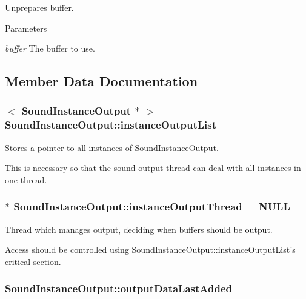 Unprepares buffer. 


\begin{DoxyParams}{Parameters}
\item[{\em buffer}]The buffer to use. \end{DoxyParams}


\subsection{Member Data Documentation}
\hypertarget{class_sound_instance_output_a6c22559d4c8c6f04ee92cf6763a8493f}{
\subsubsection[{instanceOutputList}]{$<$ {\bf SoundInstanceOutput} $\ast$ $>$ {\bf SoundInstanceOutput::instanceOutputList}}}
\label{class_sound_instance_output_a6c22559d4c8c6f04ee92cf6763a8493f}


Stores a pointer to all instances of \hyperlink{class_sound_instance_output}{SoundInstanceOutput}. 

This is necessary so that the sound output thread can deal with all instances in one thread. \hypertarget{class_sound_instance_output_af1ad50da6639146c3b0ef782bd4737ab}{
\subsubsection[{instanceOutputThread}]{ $\ast$ {\bf SoundInstanceOutput::instanceOutputThread} = NULL}}
\label{class_sound_instance_output_af1ad50da6639146c3b0ef782bd4737ab}


Thread which manages output, deciding when buffers should be output. 

Access should be controlled using \hyperlink{class_sound_instance_output_a6c22559d4c8c6f04ee92cf6763a8493f}{SoundInstanceOutput::instanceOutputList}'s critical section. \hypertarget{class_sound_instance_output_a4bb8e2de55d954056ed896e0d029bab4}{
\subsubsection[{outputDataLastAdded}]{ {\bf SoundInstanceOutput::outputDataLastAdded}}}
\label{class_sound_instance_output_a4bb8e2de55d954056ed896e0d029bab4}


